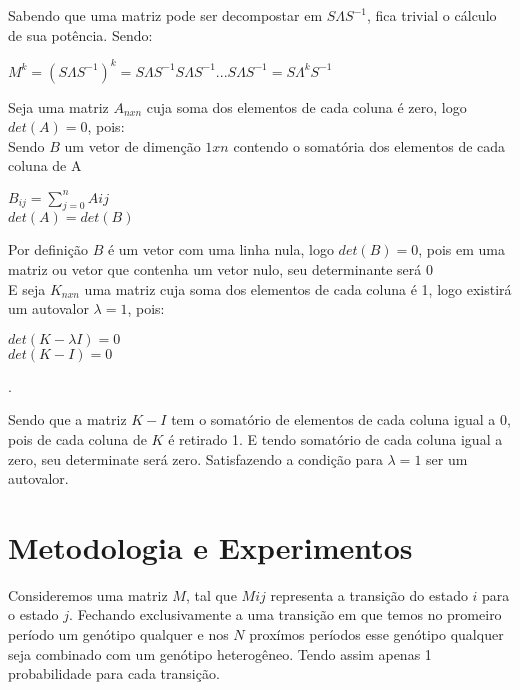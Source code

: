 \documentclass[14pt]{article}
\begin{document}
Sabendo que uma matriz pode ser decompostar em $S\Lambda S^{-1}$, fica trivial o cálculo de sua potência. Sendo:
\begin{center}
    $M^k = (S\Lambda S^{-1})^k = S\Lambda S^{-1} S\Lambda S^{-1} ... S\Lambda S^{-1} = S\Lambda^k S^{-1} $
\end{center}

$ $\\

Seja uma matriz $A_{nxn}$ cuja soma dos elementos de cada coluna é zero, logo
$det(A) = 0$, pois:\\


Sendo $B$ um vetor de dimenção $1 x n$ contendo o somatória dos elementos de cada coluna de A\\

\begin{center}
    $B_{ij} = \sum_{j=0}^{n} Aij$\\
    $det(A) = det(B)$\\
\end{center}

Por definição $B$ é um vetor com uma linha nula, logo $det(B) = 0$, pois em uma matriz ou vetor que contenha um vetor nulo, seu determinante será $0$\\

E seja $K_{nxn}$ uma matriz cuja soma dos elementos de cada coluna é 1, logo existirá um autovalor $\lambda = 1$, pois:\\

\begin{center}
    $det(K - \lambda I) = 0$\\
    $det(K - I) = 0$
\end{center}.

Sendo que a matriz $K-I$ tem o somatório de elementos de cada coluna igual a 0, pois de cada coluna de $K$ é retirado 1. E tendo somatório de cada coluna igual a zero, seu determinate será zero. Satisfazendo a condição para $\lambda = 1$ ser um autovalor.



\section{Metodologia e Experimentos}
\label{sec:metodologia}


Consideremos uma matriz $M$, tal que $Mij$ representa a transição do estado $i$ para o estado $j$. Fechando exclusivamente a uma transição em que temos no promeiro período um genótipo qualquer e nos $N$ proxímos períodos esse genótipo qualquer seja combinado com um genótipo heterogêneo. Tendo assim apenas 1 probabilidade para cada transição. 
\end{document}
